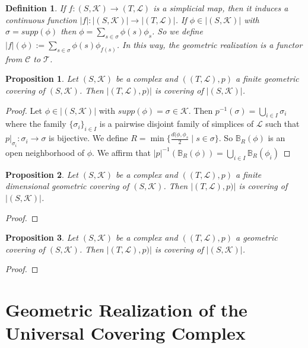 \documentclass{amsart}
\newtheorem{proposition}{Proposition}[section]
\newtheorem{definition}{Definition}[section]
\begin{document}
\begin{definition}
If $f\colon (S,\mathcal{K})\longrightarrow (T,\mathcal{L})$ is a simplicial map, then it induces a continuous function $\vert f\vert\colon \vert(S,\mathcal{K})\vert\longrightarrow \vert(T,\mathcal{L})\vert$. If $\phi\in \vert(S,\mathcal{K})\vert$ with $\sigma=supp(\phi)$ then $\phi=\sum_{s\in\sigma}\phi(s)\phi_s$. So  we define $\vert f\vert (\phi):=\sum_{s\in \sigma}\phi(s)\phi_{f(s)}$. In this way, the geometric realization is a functor from $\mathcal{C}$ to $\mathcal{T}$.
\end{definition}

\begin{proposition}
Let $(S,\mathcal{K})$ be a complex and $((T,\mathcal{L}),p)$ a finite geometric covering of $(S,\mathcal{K})$. Then $\vert (T,\mathcal{L}), p)\vert $ is covering of $\vert (S,\mathcal{K})\vert$.
\end{proposition}

\begin{proof}
Let $\phi\in \vert (S,\mathcal{K})\vert$ with $supp(\phi)=\sigma\in\mathcal{K}$. Then $p^{-1}(\sigma)=\bigcup_{i\in I}\sigma_i$ where the family $\{\sigma_i\}_{i\in I}$ is a pairwise disjoint family of simplices of $\mathcal{L}$ such that $p|_{\sigma_i}\colon \sigma_i\longrightarrow \sigma$ is bijective.  We define $R=\min\{\frac{d(\phi,\phi_s}{2}\mid s\in\sigma\}$. So $\mathbb{B}_R(\phi)$ is an open neighborhood of $\phi$. We affirm that $\vert p\vert^{-1}(\mathbb{B}_R(\phi))=\bigcup_{i\in I}\mathbb{B}_R(\phi_i)$
\end{proof}

\begin{proposition}
Let $(S,\mathcal{K})$ be a complex and $((T,\mathcal{L}),p)$ a finite dimensional geometric covering of $(S,\mathcal{K})$. Then $\vert (T,\mathcal{L}), p)\vert $ is covering of $\vert (S,\mathcal{K})\vert$.
\end{proposition}

\begin{proof}

\end{proof}

\begin{proposition}
Let $(S,\mathcal{K})$ be a complex and $((T,\mathcal{L}),p)$ a geometric covering of $(S,\mathcal{K})$. Then $\vert (T,\mathcal{L}), p)\vert $ is covering of $\vert (S,\mathcal{K})\vert$.
\end{proposition}

\begin{proof}

\end{proof}


\section{Geometric Realization of the Universal Covering Complex}





\end{document}
